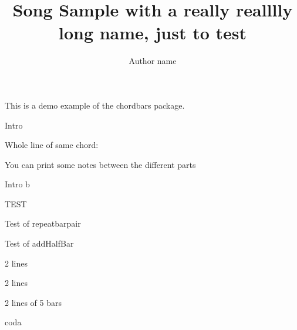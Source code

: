 \documentclass[11pt]{article}
\title{Song Sample with a really realllly long name, just to test}
\author{Author name}
\begin{document}

\countbarsYes

\songtitle

This is a demo example of the chordbars package.


\begin{chordbar}{4}{Intro}
\end{chordbar}


Whole line of same chord:


You can print some notes between the different parts

\def\barsize{1.8}%

\begin{chordbar}[3]{6}{Intro b}
\repeatBar
{}
\end{chordbar}


\def\barsize{1.4}%
\begin{chordbar}[2]{4}{TEST}
\repeatBar
\end{chordbar}

\begin{chordbar}{5}{Test of repeatbarpair}
\repeatBarPair
{}
\end{chordbar}

\begin{chordbar}{4}{Test of addHalfBar}
\repeatBar
{}
\end{chordbar}


\begin{chordbar}[2]{6}{2 lines}
\repeatBar
{}
\repeatBar
\end{chordbar}

\begin{chordbar}[4]{11}{2 lines}
\newchordline
{}
\repeatBar
\end{chordbar}

\begin{chordbar}[2]{10}{2 lines of 5 bars}
\newchordline
{}
\repeatBar
\end{chordbar}

\xdef\NumberOfBarsPerLine{8}
\begin{chordbar}[2]{6}{coda}
\end{chordbar}


\printNbBars
\end{document}
